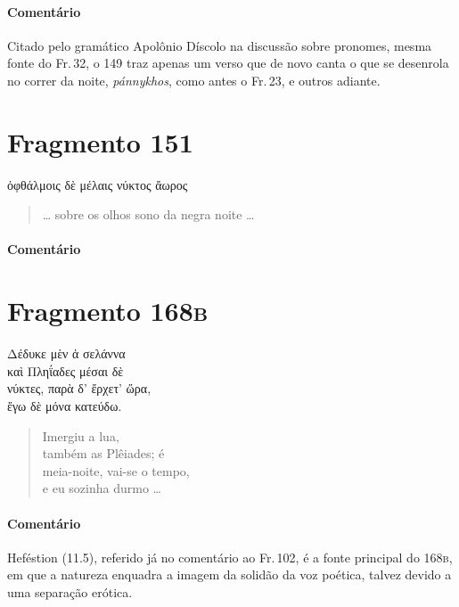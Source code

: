 {\paragraph{Comentário} Citado pelo gramático Apolônio Díscolo na discussão sobre pronomes, mesma fonte do Fr.\,32, o 149 traz apenas um verso que de novo canta o que se desenrola no correr da noite, \emph{pánnykhos}, como antes o Fr.\,23, e outros adiante.}


\section{Fragmento 151}

\begin{gkverse}
ὀφθάλμοις δὲ μέλαις νύκτος ἄωρος
\end{gkverse}

\begin{verse}
\ldots{} sobre os olhos sono da negra noite \ldots{}
\end{verse}

\medskip

 \paragraph{Comentário} 

\section{Fragmento 168\textsc{b}}

\begin{gkverse}
Δέδυκε μὲν ἀ σελάννα\\
καὶ Πληΐαδες μέσαι δὲ\\
νύκτες, παρὰ δ’ ἔρχετ’ ὤρα,\\
ἔγω δὲ μόνα κατεύδω.
\end{gkverse}

\begin{verse}
Imergiu a lua,\\
também as Plêiades; é\\
meia-noite, vai-se o tempo,\\
e eu sozinha durmo \ldots{}
\end{verse}

\medskip

\paragraph{Comentário} Heféstion (11.5), referido já no comentário ao Fr.\,102, é a fonte principal do 168\textsc{b}, em que a natureza enquadra a imagem da solidão da voz poética, talvez devido a uma separação erótica.


